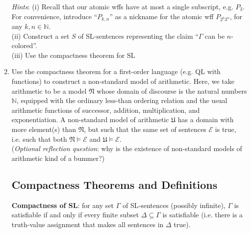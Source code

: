 \documentclass[12pt]{article}
\newcommand*{\metav}[1]{\ensuremath{\mathcal{#1}}}
\begin{document}
\begin{enumerate}
\textit{Hints}: (i) Recall that our atomic wffs have at most a single subscript, e.g. $P_3$. For convenience, introduce ``$P_{k,n}$'' as a nickname for the atomic wff $P_{2^k 3^n}$, for any $k, n \in \mathbb{N}$. \\ (ii) Construct a set $S$ of SL-sentences representing the claim ``$\Gamma$ can be $n$-colored''. \\ (iii) Use the compactness theorem for SL \\ 

\item Use the compactness theorem for a first-order language (e.g. QL with functions) to construct a non-standard model of arithmetic. Here, we take arithmetic to be a model $\mathfrak{N}$ whose domain of discourse is the natural numbers $\mathbb{N}$, equipped with the ordinary less-than ordering relation and the usual arithmetic functions of successor, addition, multiplication, and exponentiation. A non-standard model of arithmetic $\mathfrak{U}$ has a domain with more element(s) than $\mathfrak{N}$, but such that the same set of sentences $\metav{E}$ is true, i.e. such that both $\mathfrak{N} \models \metav{E}$ and $\mathfrak{U} \models \metav{E}$. \\ (\textit{Optional reflection question}: why is the existence of non-standard models of arithmetic kind of a bummer?)



\subsection*{\centering Compactness Theorems and Definitions}

\textbf{Compactness of SL}: for any set $\Gamma$ of SL-sentences (possibly infinite), $\Gamma$ is satisfiable if and only if every finite subset $\Delta \subseteq \Gamma$ is satisfiable (i.e. there is a truth-value assignment that makes all sentences in $\Delta$ true). 


\end{enumerate}
\end{document}
